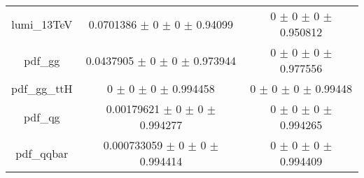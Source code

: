 \begin{table}
\begin{tabular}{ccc}
lumi\_13TeV & \num{0.0701386} $\pm$ \num{0} $\pm$ \num{0} $\pm$ \num{0.94099} & \num{0} $\pm$ \num{0} $\pm$ \num{0} $\pm$ \num{0.950812}\\
pdf\_gg & \num{0.0437905} $\pm$ \num{0} $\pm$ \num{0} $\pm$ \num{0.973944} & \num{0} $\pm$ \num{0} $\pm$ \num{0} $\pm$ \num{0.977556}\\
pdf\_gg\_ttH & \num{0} $\pm$ \num{0} $\pm$ \num{0} $\pm$ \num{0.994458} & \num{0} $\pm$ \num{0} $\pm$ \num{0} $\pm$ \num{0.99448}\\
pdf\_qg & \num{0.00179621} $\pm$ \num{0} $\pm$ \num{0} $\pm$ \num{0.994277} & \num{0} $\pm$ \num{0} $\pm$ \num{0} $\pm$ \num{0.994265}\\
pdf\_qqbar & \num{0.000733059} $\pm$ \num{0} $\pm$ \num{0} $\pm$ \num{0.994414} & \num{0} $\pm$ \num{0} $\pm$ \num{0} $\pm$ \num{0.994409}\\
\bottomrule
\end{tabular}
\end{table}